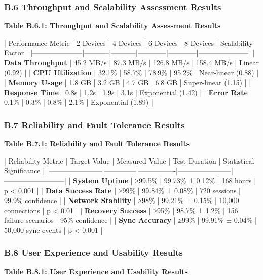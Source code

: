 \documentclass[11pt,a4paper]{article}
\begin{document}
\subsubsection{B.6 Throughput and Scalability Assessment Results}

\textbf{Table B.6.1: Throughput and Scalability Assessment Results}

| Performance Metric  | 2 Devices | 4 Devices | 6 Devices  | 8 Devices  | Scalability Factor  |
|---------------------|-----------|-----------|------------|------------|---------------------|
| \textbf{Data Throughput} | 45.2 MB/s | 87.3 MB/s | 126.8 MB/s | 158.4 MB/s | Linear (0.92)       |
| \textbf{CPU Utilization} | 32.1\%     | 58.7\%     | 78.9\%      | 95.2\%      | Near-linear (0.88)  |
| \textbf{Memory Usage}    | 1.8 GB    | 3.2 GB    | 4.7 GB     | 6.8 GB     | Super-linear (1.15) |
| \textbf{Response Time}   | 0.8s      | 1.2s      | 1.9s       | 3.1s       | Exponential (1.42)  |
| \textbf{Error Rate}      | 0.1\%      | 0.3\%      | 0.8\%       | 2.1\%       | Exponential (1.89)  |

\subsubsection{B.7 Reliability and Fault Tolerance Results}

\textbf{Table B.7.1: Reliability and Fault Tolerance Results}

| Reliability Metric    | Target Value | Measured Value | Test Duration         | Statistical Significance |
|-----------------------|--------------|----------------|-----------------------|--------------------------|
| \textbf{System Uptime}     | ≥99.5\%       | 99.73\% ± 0.12\% | 168 hours             | p < 0.001                |
| \textbf{Data Success Rate} | ≥99\%         | 99.84\% ± 0.08\% | 720 sessions          | 99.9\% confidence         |
| \textbf{Network Stability} | ≥98\%         | 99.21\% ± 0.15\% | 10,000 connections    | p < 0.01                 |
| \textbf{Recovery Success}  | ≥95\%         | 98.7\% ± 1.2\%   | 156 failure scenarios | 95\% confidence           |
| \textbf{Sync Accuracy}     | ≥99\%         | 99.91\% ± 0.04\% | 50,000 sync events    | p < 0.001                |

\subsubsection{B.8 User Experience and Usability Results}

\textbf{Table B.8.1: User Experience and Usability Results}
\end{document}
